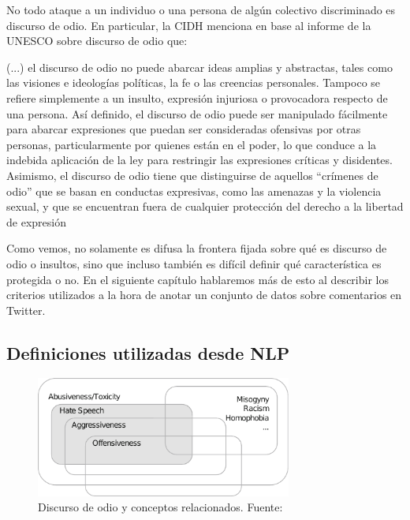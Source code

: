 No todo ataque a un individuo o una persona de algún colectivo discriminado es discurso de odio. En particular, la CIDH \cite{CIDH2015} menciona en base al informe de la UNESCO sobre discurso de odio \cite{gagliardone2015countering} que:

\begin{displayquote}[]
    (...) el discurso de odio no puede abarcar ideas amplias y abstractas, tales como las visiones e ideologías políticas, la fe o las creencias personales. Tampoco se refiere simplemente a un insulto, expresión injuriosa o provocadora respecto de una persona. Así definido, el discurso de odio puede ser manipulado fácilmente para abarcar expresiones que puedan ser consideradas ofensivas por otras personas, particularmente por quienes están en el poder, lo que conduce a la indebida aplicación de la ley para restringir las expresiones críticas y disidentes. Asimismo, el discurso de odio tiene que distinguirse de aquellos ``crímenes de odio'' que se basan en conductas expresivas, como las amenazas y la violencia sexual, y que se encuentran fuera de cualquier protección del derecho a la libertad de expresión
\end{displayquote}

Como vemos, no solamente es difusa la frontera fijada sobre qué es discurso de odio o insultos, sino que incluso también es difícil definir qué característica es protegida o no. En el siguiente capítulo hablaremos más de esto al describir los criterios utilizados a la hora de anotar un conjunto de datos sobre comentarios en Twitter.


\subsection{Definiciones utilizadas desde NLP}

\begin{figure}
    \centering
    \includegraphics[width=0.75\textwidth]{img/04/poletto_hs_vs_offensive.pdf}
    \caption{Discurso de odio y conceptos relacionados. Fuente: \citet{poletto2021resources}}
    \label{fig:hate_speech_definition_and_other_concepts}
\end{figure}



